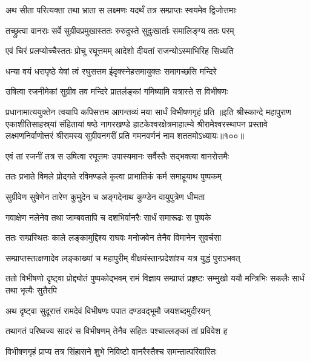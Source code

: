 \twolineshloka
{अथ सीता परित्यक्ता तथा भ्राता स लक्ष्मणः}
{यदर्थं तत्र सम्प्राप्तः स्वयमेव द्विजोत्तमाः}%

\twolineshloka
{तच्छ्रुत्वा वानराः सर्वे सुग्रीवप्रमुखास्ततः}
{रुरुदुस्ते सुदुःखार्ताः समालिङ्ग्य ततः परम्}%

\twolineshloka
{एवं चिरं प्रलप्योच्चैस्ततः प्रोचू रघूत्तमम्}
{आदेशो दीयतां राजन्योऽस्माभिरिह सिध्यति}%

\twolineshloka
{धन्या वयं धरापृष्ठे येषां त्वं रघुसत्तम}
{ईदृक्स्नेहसमायुक्तः समागच्छसि मन्दिरे}%


\twolineshloka
{उषित्वा रजनीमेकां सुग्रीव तव मन्दिरे} 
{प्रातर्लङ्कां गमिष्यामि यत्रास्ते स विभीषणः}%

\twolineshloka
{प्रधानामात्ययुक्तेन त्वयापि कपिसत्तम}
{आगन्तव्यं मया सार्धं विभीषणगृहं प्रति}%
॥इति श्रीस्कान्दे महापुराण एकाशीतिसाहस्र्यां संहितायां षष्ठे नागरखण्डे हाटकेश्वरक्षेत्रमाहात्म्ये श्रीरामेश्वरस्थापन प्रस्तावे लक्ष्मणनिर्वाणोत्तरं श्रीरामस्य सुग्रीवनगरीं प्रति गमनवर्णनं नाम शततमोऽध्यायः॥१००॥


\twolineshloka
{एवं तां रजनीं तत्र स उषित्वा रघूत्तमः}
{उपास्यमानः सर्वैस्तैः सद्भक्त्या वानरोत्तमैः}%

\twolineshloka
{ततः प्रभाते विमले प्रोद्गते रविमण्डले}
{कृत्वा प्राभातिकं कर्म समाहूयाथ पुष्पकम्}%

\twolineshloka
{सुग्रीवेण सुषेणेन तारेण कुमुदेन च}
{अङ्गदेनाथ कुण्डेन वायुपुत्रेण धीमता}%

\twolineshloka
{गवाक्षेण नलेनेव तथा जाम्बवतापि च}
{दशभिर्वानरैः सार्धं समारूढः स पुष्पके}%

\twolineshloka
{ततः सम्प्रस्थितः काले लङ्कामुद्दिश्य राघवः}
{मनोजवेन तेनैव विमानेन सुवर्चसा}%

\twolineshloka
{सम्प्राप्तस्तत्क्षणादेव लङ्काख्यां च महापुरीम्}
{वीक्षयंस्तान्प्रदेशांश्च यत्र युद्धं पुराऽभवत्}%

\threelineshloka
{ततो विभीषणो दृष्ट्वा प्रोद्द्योतं पुष्पकोद्भवम्}
{रामं विज्ञाय सम्प्राप्तं प्रहृष्टः सम्मुखो ययौ}
{मन्त्रिभिः सकलैः सार्धं तथा भृत्यैः सुतैरपि}%

\twolineshloka
{अथ दृष्ट्वा सुदूरात्तं रामदेवं विभीषणः}
{पपात दण्डवद्भूमौ जयशब्दमुदीरयन्}%

\twolineshloka
{तथागतं परिष्वज्य सादरं स विभीषणम्}
{तेनैव सहितः पश्चाल्लङ्कां तां प्रविवेश ह}%

\twolineshloka
{विभीषणगृहं प्राप्य तत्र सिंहासने शुभे}
{निविष्टो वानरैस्तैश्च समन्तात्परिवारितः}%

